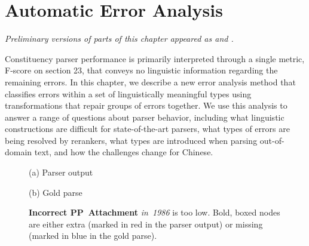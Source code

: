 \chapter{Automatic Error Analysis} \label{chp:analysis}

\begin{center}
\textit{
  Preliminary versions of parts of this chapter appeared as \textcite{Kummerfeld-etal:2012:EMNLP} and \textcite{Kummerfeld-etal:2013:ACL}.
}
\end{center}

Constituency parser performance is primarily interpreted through a single metric, F-score on \wsj section 23, that conveys no linguistic information regarding the remaining errors.
In this chapter, we describe a new error analysis method that classifies errors within a set of linguistically meaningful types using transformations that repair groups of errors together.
We use this analysis to answer a range of questions about parser behavior, including what linguistic constructions are difficult for state-of-the-art parsers, what types of errors are being resolved by rerankers, what types are introduced when parsing out-of-domain text, and how the challenges change for Chinese.

\begin{figure}
\begin{center}

\vspace{3mm}
(a) Parser output

\vspace{6mm}


(b) Gold parse
\end{center}
\derivspace
\caption[Error analysis example: PP attachment.]{ \label{fig:PP-attachment}
	\textbf{Incorrect PP~Attachment} \emph{in~1986} is too low.
	Bold, boxed nodes are either extra (marked in red in the parser output) or missing (marked in blue in the gold parse).
}
\derivaftercompress
\end{figure}

